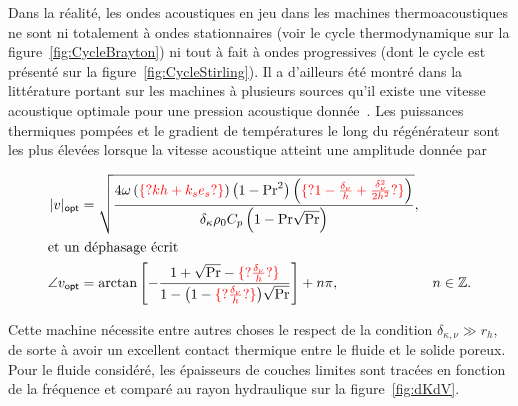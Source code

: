 \medskip

Dans la réalité, les ondes acoustiques en jeu dans les machines thermoacoustiques ne sont ni totalement \og à ondes stationnaires \fg{} (voir le cycle thermodynamique sur la figure~\ref{fig:CycleBrayton}) ni tout à fait \og à ondes progressives \fg{} (dont le cycle est présenté sur la figure~\ref{fig:CycleStirling}). Il a d'ailleurs été montré dans la littérature portant sur les machines à plusieurs sources qu'il existe une vitesse acoustique optimale pour une pression acoustique donnée~\cite{poignand_etude_2006, poignand_optimal_2007, poignand_thermoacoustic_2011}. Les puissances thermiques pompées et le gradient de températures le long du régénérateur sont les plus élevées lorsque la vitesse acoustique atteint une amplitude donnée par

\begin{subequations}
	\begin{align}
		|v|_{\sf opt} &= \sqrt{\frac{4\omega\left(\textcolor{red}{\{?kh+k_se_s?\}}\right)\left(1-\mathrm{Pr}^2\right)\left(\textcolor{red}{\{?1-\frac{\delta_\nu}{h}+\frac{\delta_\nu^2}{2h^2}?\}}\right)}{\delta_\kappa \rho_0 C_p \left(1-\mathrm{Pr}\sqrt{\mathrm{Pr}}\right)}}, & 	\label{eq:u_mag_opt_Gaelle}\\
		\intertext{et un déphasage écrit}
		\angle v_{\sf opt} &= \arctan\left[-\frac{1+\sqrt{\mathrm{Pr}}-\textcolor{red}{\{?\frac{\delta_\nu}{h}?\}}}{1-\big(1-\textcolor{red}{\{?\frac{\delta_\nu}{h}?\}}\big)\sqrt{\mathrm{Pr}}}\right]+n \pi, & n \in \mathbb{Z}.	\label{eq:u_arg_opt_Gaelle}
	\end{align}
	\label{eq:u_opt_Gaelle}
\end{subequations}

Cette machine nécessite entre autres choses le respect de la condition $\delta_{\kappa,\nu} \gg r_h$, de sorte à avoir un excellent contact thermique entre le fluide et le solide poreux. Pour le fluide considéré, les épaisseurs de couches limites sont tracées en fonction de la fréquence et comparé au rayon hydraulique sur la figure~\ref{fig:dKdV}.

